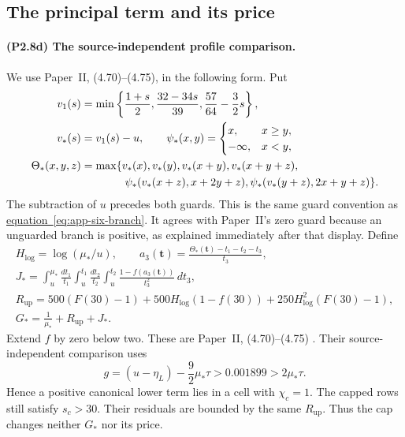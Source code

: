 \subsection{The principal term and its price}

\paragraph{(P2.8d) The source-independent profile comparison.}
We use Paper~II, (4.70)--(4.75), in the following form.
Put
\begin{equation}\label{eq:l3-profile}
\begin{aligned}
 v_1(s)&=\min\left\{\frac{1+s}{2},\frac{32-34s}{39},
                                      \frac{57}{64}-\frac32s\right\},\\
 v_*(s)&=v_1(s)-u,\qquad
 \psi_*(x,y)=\begin{cases}x,&x\ge y,\\-\infty,&x<y,\end{cases}\\
 \Theta_*(x,y,z)&=\max\{v_*(x),v_*(y),v_*(x+y),v_*(x+y+z),\\
 &\hspace{14mm}\psi_*(v_*(x+z),x+2y+z),
                    \psi_*(v_*(y+z),2x+y+z)\}.
\end{aligned}
\end{equation}
The subtraction of $u$ precedes both guards.
This is the same guard convention as
\hyperref[eq:app-six-branch]{equation~\ref*{eq:app-six-branch}}.
It agrees with Paper~II's zero guard because an unguarded branch is
positive, as explained immediately after that display.
Define
\begin{equation}\label{eq:l3-Gstar}
\begin{gathered}
 H_{\log}=\log(\mu_*/u),\qquad
 a_3(\mathbf t)=\frac{\Theta_*(\mathbf t)-t_1-t_2-t_3}{t_3},\\
 J_*=\int_u^{\mu_*}\frac{dt_1}{t_1}\int_u^{t_1}\frac{dt_2}{t_2}
                 \int_u^{t_2}\frac{1-f(a_3(\mathbf t))}{t_3^2}\,dt_3,\\
 R_{\mathrm{up}}=500(F(30)-1)+500H_{\log}(1-f(30))
                         +250H_{\log}^2(F(30)-1),\\
 G_*=\frac1{\mu_*}+R_{\mathrm{up}}+J_*.
\end{gathered}
\end{equation}
Extend $f$ by zero below two.
These are Paper~II, (4.70)--(4.75)
\cite[(4.70)--(4.75)]{PaperII}.
Their source-independent comparison uses
\begin{equation}\label{eq:l3-profile-margin}
 g=(u-\eta_L)-\frac92\mu_*\tau>0.001899>2\mu_*\tau.
\end{equation}
Hence a positive canonical lower term lies in a cell with $\chi_c=1$.
The capped rows still satisfy $s_c>30$.
Their residuals are bounded by the same $R_{\mathrm{up}}$.
Thus the cap changes neither $G_*$ nor its price.

